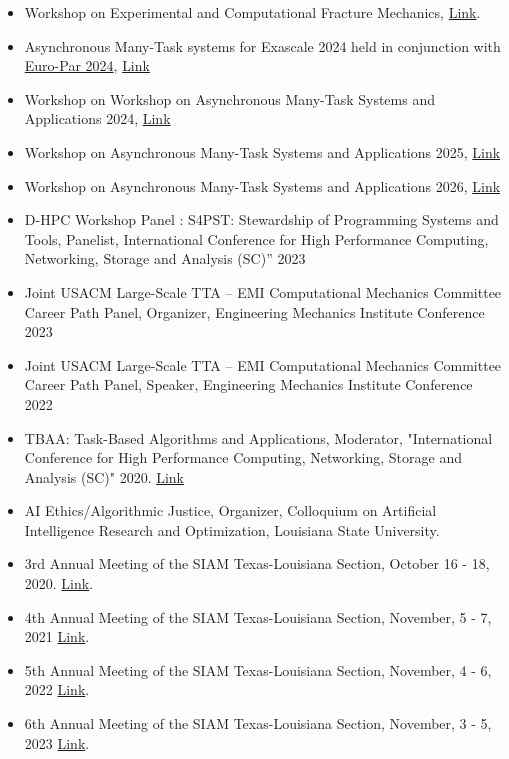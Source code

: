 \documentclass[11pt,a4paper,sans]{moderncv}
\begin{document}
\begin{itemize}[leftmargin=4cm]
\item Workshop on Experimental and Computational Fracture Mechanics, \href{http://wfm2024.usacm.org/}{Link}.
\item Asynchronous Many-Task systems for Exascale 2024 held in conjunction with \href{https://2024.euro-par.org/}{Euro-Par 2024},  \href{https://amte-workshop.github.io/2024/}{Link}
\item Workshop on Workshop on Asynchronous Many-Task Systems and Applications 2024,  \href{http://wamta24.icl.utk.edu/}{Link}
\item Workshop on Asynchronous Many-Task Systems and Applications 2025, \href{https://wamta25.github.io/}{Link}
\item Workshop on Asynchronous Many-Task Systems and Applications 2026, \href{https://wamta26.stellar-group.org/}{Link}
\end{itemize}

\begin{itemize}[leftmargin=4cm]
\item D-HPC Workshop Panel : S4PST: Stewardship of Programming Systems and Tools, Panelist, International Conference for High Performance Computing, Networking, Storage and Analysis (SC)” 2023
\item Joint USACM Large-Scale TTA – EMI Computational Mechanics Committee Career Path Panel, Organizer, Engineering Mechanics Institute Conference 2023
\item Joint USACM Large-Scale TTA – EMI Computational Mechanics Committee Career Path Panel, Speaker, Engineering Mechanics Institute Conference 2022
\item TBAA: Task-Based Algorithms and Applications, Moderator, "International Conference for High Performance Computing, Networking, Storage and Analysis (SC)" 2020. \href{https://stellar-group.org/research/tbaa2020-scpanel/}{Link}
\item AI Ethics/Algorithmic Justice, Organizer, Colloquium on Artificial Intelligence Research and Optimization,  Louisiana State University. 
\end{itemize}


\begin{itemize}[leftmargin=4cm]
\item 3rd Annual Meeting of the SIAM Texas-Louisiana Section, October 16 - 18,  2020. \href{https://www.math.tamu.edu/conferences/SIAMTXLA/}{Link}.
\item 4th Annual Meeting of the SIAM Texas-Louisiana Section,  November,  5 - 7,  2021 \href{https://faculty.utrgv.edu/eleftherios.gkioulekas/2021-siam-txla-meeting-spi/index.html}{Link}.
\item 5th Annual Meeting of the SIAM Texas-Louisiana Section,  November,  4 - 6,  2022 \href{https://www.math.uh.edu/siamtxla22/index.shtml}{Link}.
\item 6th Annual Meeting of the SIAM Texas-Louisiana Section,  November,  3 - 5,  2023 \href{https://userweb.ucs.louisiana.edu/~C00424602/SIAMTXLA2023/}{Link}.
\end{itemize}
\end{document}
